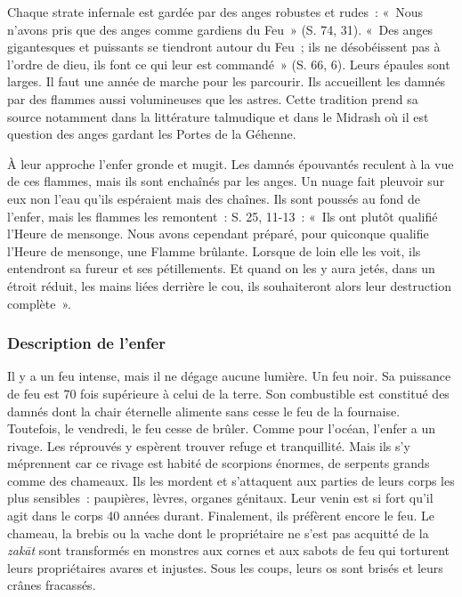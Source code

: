 
Chaque strate infernale est gardée par des anges robustes et rudes~:
«~Nous n'avons pris que des anges comme gardiens du Feu~» (S. 74, 31).
«~Des anges gigantesques et puissants se tiendront autour du Feu~; ils
ne désobéissent pas à l'ordre de dieu, ils font ce qui leur est
commandé~» (S. 66, 6). Leurs épaules sont larges. Il faut une année de
marche pour les parcourir. Ils accueillent les damnés par des flammes
aussi volumineuses que les astres. Cette tradition prend sa source
notamment dans la littérature talmudique et dans le Midrash où il est
question des anges gardant les Portes de la Géhenne.

À leur approche l'enfer gronde et mugit. Les damnés épouvantés reculent
à la vue de ces flammes, mais ils sont enchaînés par les anges. Un nuage
fait pleuvoir sur eux non l'eau qu'ils espéraient mais des chaînes. Ils
sont poussés au fond de l'enfer, mais les flammes les remontent~: S. 25,
11-13~: «~Ils ont plutôt qualifié l'Heure de mensonge. Nous avons
cependant préparé, pour quiconque qualifie l'Heure de mensonge, une
Flamme brûlante. Lorsque de loin elle les voit, ils entendront sa fureur
et ses pétillements. Et quand on les y aura jetés, dans un étroit
réduit, les mains liées derrière le cou, ils souhaiteront alors leur
destruction complète~».


\subsubsection{Description de l'enfer}\label{description-de-lenfer}

Il y a un feu intense, mais il ne dégage aucune lumière. Un feu noir. Sa
puissance de feu est 70 fois supérieure à celui de la terre. Son
combustible est constitué des damnés dont la chair éternelle alimente
sans cesse le feu de la fournaise. Toutefois, le vendredi, le feu cesse
de brûler. Comme pour l'océan, l'enfer a un rivage. Les réprouvés y
espèrent trouver refuge et tranquillité. Mais ils s'y méprennent car ce
rivage est habité de scorpions énormes, de serpents grands comme des
chameaux. Ils les mordent et s'attaquent aux parties de leurs corps les
plus sensibles~: paupières, lèvres, organes génitaux. Leur venin est si
fort qu'il agit dans le corps 40 années durant. Finalement, ils
préfèrent encore le feu. Le chameau, la brebis ou la vache dont le
propriétaire ne s'est pas acquitté de la \emph{zakāt} sont transformés
en monstres aux cornes et aux sabots de feu qui torturent leurs
propriétaires avares et injustes. Sous les coups, leurs os sont brisés
et leurs crânes fracassés.

